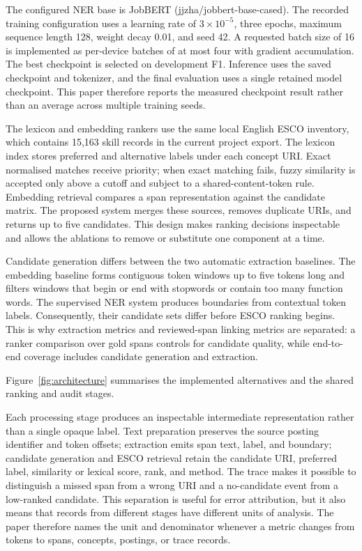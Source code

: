 \documentclass[conference]{IEEEtran}
\begin{document}
The configured NER base is JobBERT (\textsf{jjzha/jobbert-base-cased}). The recorded training configuration uses a learning rate of $3\times10^{-5}$, three epochs, maximum sequence length 128, weight decay 0.01, and seed 42. A requested batch size of 16 is implemented as per-device batches of at most four with gradient accumulation. The best checkpoint is selected on development F1. Inference uses the saved checkpoint and tokenizer, and the final evaluation uses a single retained model checkpoint. This paper therefore reports the measured checkpoint result rather than an average across multiple training seeds.

The lexicon and embedding rankers use the same local English ESCO inventory, which contains 15,163 skill records in the current project export. The lexicon index stores preferred and alternative labels under each concept URI. Exact normalised matches receive priority; when exact matching fails, fuzzy similarity is accepted only above a cutoff and subject to a shared-content-token rule. Embedding retrieval compares a span representation against the candidate matrix. The proposed system merges these sources, removes duplicate URIs, and returns up to five candidates. This design makes ranking decisions inspectable and allows the ablations to remove or substitute one component at a time.

Candidate generation differs between the two automatic extraction baselines. The embedding baseline forms contiguous token windows up to five tokens long and filters windows that begin or end with stopwords or contain too many function words. The supervised NER system produces boundaries from contextual token labels. Consequently, their candidate sets differ before ESCO ranking begins. This is why extraction metrics and reviewed-span linking metrics are separated: a ranker comparison over gold spans controls for candidate quality, while end-to-end coverage includes candidate generation and extraction.

Figure~\ref{fig:architecture} summarises the implemented alternatives and the shared ranking and audit stages.

Each processing stage produces an inspectable intermediate representation rather than a single opaque label. Text preparation preserves the source posting identifier and token offsets; extraction emits span text, label, and boundary; candidate generation and ESCO retrieval retain the candidate URI, preferred label, similarity or lexical score, rank, and method. The trace makes it possible to distinguish a missed span from a wrong URI and a no-candidate event from a low-ranked candidate. This separation is useful for error attribution, but it also means that records from different stages have different units of analysis. The paper therefore names the unit and denominator whenever a metric changes from tokens to spans, concepts, postings, or trace records.
\end{document}

